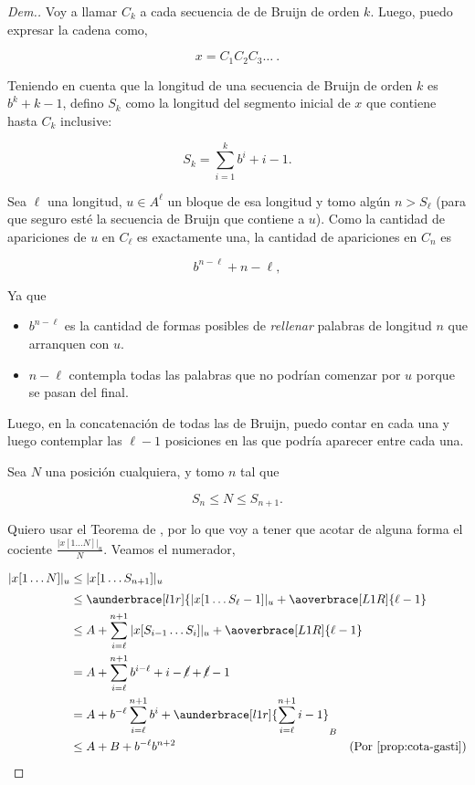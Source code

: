 \documentclass{article}
\theoremstyle{definition} %
\begin{document}
\begin{proof}[Dem.]
    Voy a llamar $C_k$ a cada secuencia de de Bruijn de orden $k$. Luego, puedo
    expresar la cadena como,

    \[
        x = C_1 C_2 C_3 \dots\ .
    \]

    Teniendo en cuenta que la longitud de una secuencia de Bruijn de orden $k$
    es $b^k + k - 1$, defino $S_k$ como la longitud del segmento inicial de $x$
    que contiene hasta $C_k$ inclusive:

    \[
        S_k = \sum_{i=1}^{k} b^i + i - 1.
    \]

    Sea $\ell$ una longitud, $u \in A^\ell$ un bloque de esa longitud y tomo
    algún $n > S_\ell$ (para que seguro esté la secuencia de Bruijn que contiene
    a $u$). Como la cantidad de apariciones de $u$ en $C_\ell$ es exactamente
    una, la cantidad de apariciones en $C_n$ es

    \[
        b^{n-\ell} + n - \ell,
    \]

    Ya que

    \begin{itemize}
        \item $b^{n-\ell}$ es la cantidad de formas posibles de
        \textit{rellenar} palabras de longitud $n$ que arranquen con $u$.
        \item $n - \ell$ contempla todas las palabras que no podrían comenzar
        por $u$ porque se pasan del final. 
    \end{itemize}

    Luego, en la concatenación de todas las de Bruijn, puedo contar en cada una
    y luego contemplar las $\ell - 1$ posiciones en las que podría aparecer
    entre cada una.

    Sea $N$ una posición cualquiera, y tomo $n$ tal que

    $$S_{n} \leq N \leq S_{n+1}.$$

    Quiero usar el Teorema de , por lo que voy a
    tener que acotar de alguna forma el cociente $\frac{|x[1\dots N]|_u}{N}$.
    Veamos el numerador,

    \begin{align*}
        |x[1\dots N]|_u
            &\leq |x[1\dots S_{n+1}]|_u\\
            &\leq \aunderbrace[l1r]{
                |x[1\dots S_{\ell} - 1]|_u + 
                \aoverbrace[L1R]{\ell - 1}
                    ^{\hidewidth\text{entre bloques}\hidewidth}}_{A}
                +|x[S_{\ell}\dots S_{n+1}]|_u\\
            &\leq A + \sum_{i=\ell}^{n+1} |x[S_{i-1} \dots S_i]|_u + \aoverbrace[L1R]{\ell - 1}^{\hidewidth\text{entre bloques}\hidewidth} \\
            &= A + \sum_{i=\ell}^{n+1} b^{i - \ell} + i - \cancel{\ell} + \cancel{\ell} - 1 \\
            &= A + b^{-\ell}\sum_{i=\ell}^{n+1} b^{i} + 
                \aunderbrace[l1r]{\sum_{i=\ell}^{n+1} i - 1}_{B}\\
            &\leq A + B + b^{-\ell} b^{n+2} & \text{(Por \ref{prop:cota-gasti})}
    \end{align*}


\end{proof}
\end{document}
